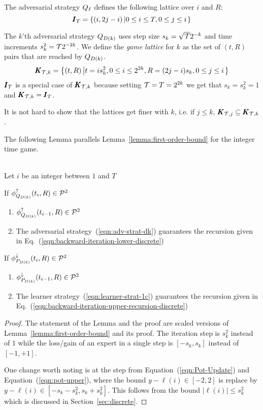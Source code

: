 \documentclass[anon,12pt]{colt2024} %
\begin{document}
The adversarial strategy $Q_I$ defines the following lattice over $i$ and $R$:
$$\pmb{I}_{T}=\left\{ (i,2j-i) \left| 0 \leq i \leq T, 0 \leq j \leq i\right. \right\}$$

The $k$'th adversarial strategy $Q_{D(k)}$ uses step size $s_k=\sqrt{\mathcal{T}} 2^{-k}$ and time
increments $s_k^2=\mathcal{T} 2^{-2k}$. We define the {\em game lattice}
for $k$ as the set of $(t,R)$ pairs that are reached by $Q_{D(k)}$.
\begin{equation}  \label{eqn:game-lattice}
  \pmb{K}_{{\mathcal{T},k}}=\left\{ (t,R) \left| t=i s_k^2, 0 \leq i \leq 2^{2k}, R=(2j-i)s_k, 0 \leq j \leq i\right. \right\}
  \end{equation}
$\pmb{I}_{T}$ is a special case of $\pmb{K}_{\mathcal{T},k}$ because setting
$\mathcal{T}=T=2^{2k}$ we get that $s_k=s_k^2=1$ and  $\pmb{K}_{\mathcal{T},k} = \pmb{I}_{T}$.

It is not hard to show that the lattices get finer with $k$, i.e. if  $j \leq k$,  $\pmb{K}_{\mathcal{T},j} \subseteq \pmb{K}_{\mathcal{T},k}$.


The following Lemma parallels Lemma~\ref{lemma:first-order-bound} for the integer time game.
\begin{lemma} \label{lemma:discrete-step-bound}
~\\
Let $i$ be an integer between $1$ and $T$

If $\phi_{Q_{D(k)}}^{\uparrow}(t_i,R) \in {\cal P}^{2}$
\begin{enumerate}
\item  $\phi_{Q_{D(k)}}^{\uparrow}(t_{i-1},R) \in {\cal P}^{2}$
\item The adversarial strategy~(\ref{eqn:adv-strat-dk})
  guarantees the recursion given in Eq.~(\ref{eqn:backward-iteration-lower-discrete})
\end{enumerate}

If $\phi_{P_{D(k)}}^{\downarrow}(t_i,R) \in {\cal P}^{2}$
\begin{enumerate}
\item $\phi_{P_{D(k)}}^{\downarrow}(t_{i-1},R) \in {\cal P}^{2}$
\item The learner strategy~(\ref{eqn:learner-strat-1c})
  guarantees the recursion given in Eq.~(\ref{eqn:backward-iteration-upper-recursion-discrete})
\end{enumerate}

\end{lemma}
\begin{proof}
The statement of the Lemma and the proof are scaled versions of
Lemma~\ref{lemma:first-order-bound} and its proof. The iteration step
is $s_k^2$ instead of $1$ while the loss/gain of an expert in a single
step is $[-s_k,s_k]$ instead of $[-1,+1]$.

One change worth noting is at the step from
Equation~(\ref{eqn:Pot-Update}) and Equation~(\ref{eqn:pot-upper}),
where the bound  $y-\ell(i) \in [-2,2]$ is replace by  $y-\ell(i) \in
[-s_k-s_k^2,s_k+s_k^2]$. This follows from the bound $|\ell(i)| \leq
s_k^2$ which is discussed in Section~\ref{sec:discrete}.
\end{proof}
\end{document}
